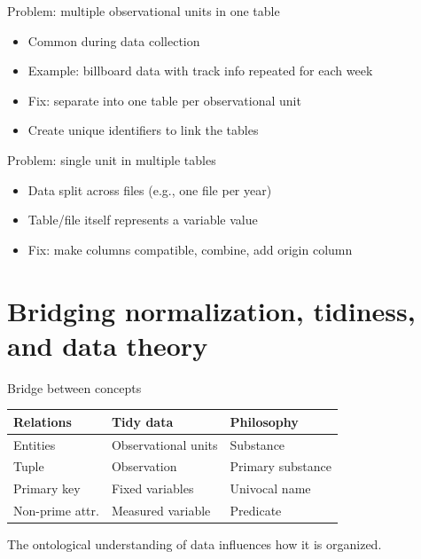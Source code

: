 \begin{frame}{Problem: multiple observational units in one table}
  \begin{itemize}
    \item Common during data collection
    \item Example: billboard data with track info repeated for each week
    \item Fix: separate into one table per observational unit
    \item Create unique identifiers to link the tables
  \end{itemize}
\end{frame}

\begin{frame}{Problem: single unit in multiple tables}
  \begin{itemize}
    \item Data split across files (e.g., one file per year)
    \item Table/file itself represents a variable value
    \item Fix: make columns compatible, combine, add origin column
  \end{itemize}
\end{frame}

\section{Bridging normalization, tidiness, and data theory}

\begin{frame}{Bridge between concepts}
  \centering
  \begin{tabular}{lll}
    \toprule
    \textbf{Relations} & \textbf{Tidy data} & \textbf{Philosophy} \\
    \midrule
    Entities & Observational units & Substance \\
    Tuple & Observation & Primary substance \\
    Primary key & Fixed variables & Univocal name \\
    Non-prime attr. & Measured variable & Predicate \\
    \bottomrule
  \end{tabular}

  \vspace{0.5cm}
  \raggedright
  The ontological understanding of data influences how it is organized.
\end{frame}

